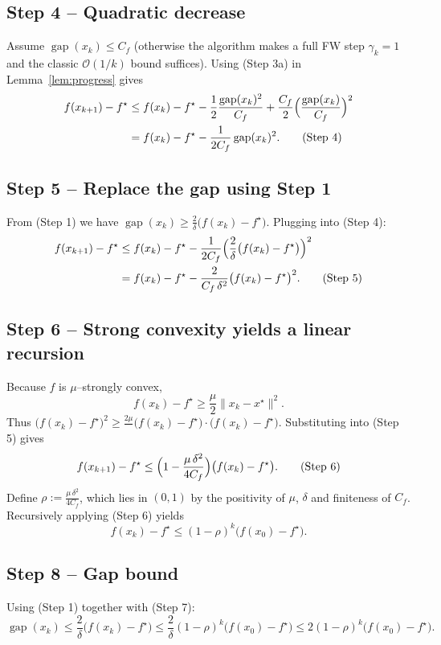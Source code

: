 \documentclass{article}
\newcommand{\gap}{\operatorname{gap}}
\begin{document}
\subsection*{Step 4 – Quadratic decrease}
Assume $\gap(x_{k})\le C_{f}$ (otherwise the algorithm makes a full FW step
$\gamma_{k}=1$ and the classic $\mathcal{O}(1/k)$ bound suffices).  Using
(Step 3a) in Lemma~\ref{lem:progress} gives
\[
\begin{aligned}
f(x_{k+1})-f^{\star}
&\le f(x_{k})-f^{\star}
      -\frac{1}{2}\frac{\gap(x_{k})^{2}}{C_{f}}
      +\frac{C_{f}}{2}\Bigl(\frac{\gap(x_{k})}{C_{f}}\Bigr)^{2} \\
&= f(x_{k})-f^{\star}
      -\frac{1}{2C_{f}}\gap(x_{k})^{2}. \tag{Step 4}
\end{aligned}
\]

\subsection*{Step 5 – Replace the gap using Step 1}
From (Step 1) we have $\gap(x_{k})\ge \frac{2}{\delta}\bigl(f(x_{k})-f^{\star}\bigr)$.
Plugging into (Step 4):
\[
\begin{aligned}
f(x_{k+1})-f^{\star}
&\le f(x_{k})-f^{\star}
      -\frac{1}{2C_{f}}\Bigl(\frac{2}{\delta}\bigl(f(x_{k})-f^{\star}\bigr)\Bigr)^{2}\\
&= f(x_{k})-f^{\star}
      -\frac{2}{C_{f}\,\delta^{2}}\bigl(f(x_{k})-f^{\star}\bigr)^{2}. \tag{Step 5}
\end{aligned}
\]

\subsection*{Step 6 – Strong convexity yields a linear recursion}
Because $f$ is $\mu$–strongly convex,
\[
f(x_{k})-f^{\star}\ge \frac{\mu}{2}\|x_{k}-x^{\star}\|^{2}.
\]
Thus $\bigl(f(x_{k})-f^{\star}\bigr)^{2}\ge \frac{2\mu}{\;}\bigl(f(x_{k})-f^{\star}\bigr)\cdot
\bigl(f(x_{k})-f^{\star}\bigr)$.  Substituting into (Step 5) gives
\[
f(x_{k+1})-f^{\star}
\le \Bigl(1-\frac{ \mu\,\delta^{2}}{4 C_{f}}\Bigr)\bigl(f(x_{k})-f^{\star}\bigr). \tag{Step 6}
\]
Define $\rho:=\frac{\mu\,\delta^{2}}{4 C_{f}}$, which lies in $(0,1)$ by the
positivity of $\mu$, $\delta$ and finiteness of $C_{f}$.  Recursively applying
(Step 6) yields
\[
f(x_{k})-f^{\star}\le (1-\rho)^{k}\bigl(f(x_{0})-f^{\star}\bigr). \tag{Step 7}
\]

\subsection*{Step 8 – Gap bound}
Using (Step 1) together with (Step 7):
\[
\gap(x_{k})\le \frac{2}{\delta}\bigl(f(x_{k})-f^{\star}\bigr)
           \le \frac{2}{\delta}(1-\rho)^{k}\bigl(f(x_{0})-f^{\star}\bigr)
           \le 2(1-\rho)^{k}\bigl(f(x_{0})-f^{\star}\bigr). \tag{Step 8}
\]
\end{document}
